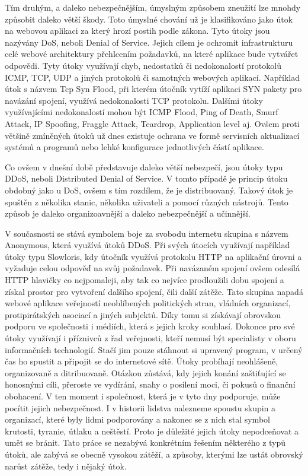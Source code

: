 \documentclass[12pt]{article}
\begin{document}
Tím druhým, a daleko nebezpečnějším, úmyslným způsobem zneužití lze mnohdy způsobit daleko větší škody. Toto úmyslné chování už je klasifikováno jako útok na webovou aplikaci za který hrozí postih podle zákona. Tyto útoky jsou nazývány DoS, neboli Denial of Service. Jejich cílem je ochromit infrastrukturu celé webové architektury přehlcením požadavků, na které aplikace bude vytvářet odpovědi. Tyty útoky využívají chyb, nedostatků či nedokonalostí protokolů ICMP, TCP, UDP a jiných protokolů či samotných webových aplikací. Například útok s názvem Tcp Syn Flood, při kterém útočník vytíží aplikaci SYN pakety pro navázání spojení, využívá nedokonalosti TCP protokolu. Dalšími útoky využívajícími nedokonalostí mohou být ICMP Flood, Ping of Death, Smurf Attack, IP Spoofing, Fraggle Attack, Teardrop, Application level aj. Ovšem proti většině zmíněných útoků už dnes existuje ochrana ve formě servisních aktualizací systémů a programů nebo lehké konfigurace jednotlivých částí aplikace. \cite{dos}

Co ovšem v dnešní době představuje daleko větší nebezpečí, jsou útoky typu DDoS, neboli Distributed Denial of Service. V tomto případě je princip útoku obdobný jako u DoS, ovšem s tím rozdílem, že je distribuovaný. Takový útok je spuštěn z několika stanic, několika uživateli a pomocí různých nástrojů. Tento způsob je daleko organizoavnější a daleko nebezpečnější a učinnější. \cite{dos}

V současnosti se stává symbolem boje za svobodu internetu skupina s názvem Anonymous, která využívá útoků DDoS. Při svých útocích využívají například útoky typu Slowloris, kdy útočník využívá protokolu HTTP na aplikační úrovni a vyžaduje celou odpověď na svůj požadavek. Při navázaném spojení ovšem odesílá HTTP hlavičky co nejpomaleji, aby tak co nejvíce prodloužili dobu spojení a získal prostor pro vytvoření dalšího spojení, čili další zátěže. Tato skupina napadá webové aplikace veřejností neoblíbených politických stran, vládních organizací, protipirátských asociací a jiných subjektů. Díky tomu si získávají obrovskou podporu ve společnosti i médiích, která s jejich kroky souhlasí. Dokonce pro své útoky využívají i příznivců z řad veřejnosti, kteří nemusí být specialisty v oboru informačních technologií. Stačí jim pouze stáhnout si upravený program, v určený čas ho spustit a připojit se do internetové sítě. Útoky probíhají neohlášeně, organizovaně a ditribuovaně. Otázkou zůstává, kdy jejich konání zaštiťující se honosnými cíli, přeroste ve vydírání, snahy o posílení moci, či pokusů o finanční obohacení. V ten moment i společnost, která je v tyto dny podporuje, může pocítit jejich nebezpečnost. I v historii lidstva nalezneme spoustu skupin a organizací, které byly lidmi podporovány a nakonec se z nich stal symbol krutosti, tyranie, útlaku a neštěstí. Proto je důležité jejich útoky nepodceňovat a umět se bránit. Tato práce se nezabývá konkrétním řešením některého z typů útoků, ale zabývá se obecně vysokou zátěží, a způsoby, kterými lze ustát obrovský narůst zátěže, tedy i nějaký útok. \cite{anonymous}
\end{document}
